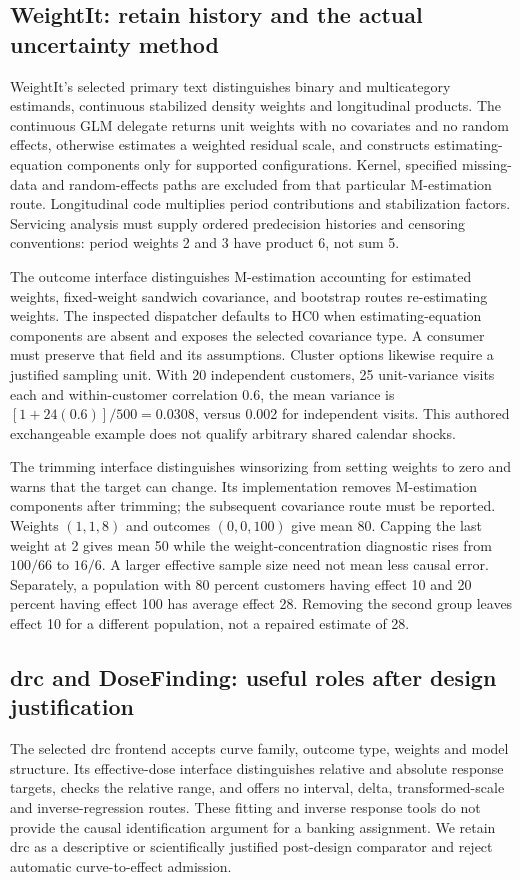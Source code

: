 \subsection{WeightIt: retain history and the actual uncertainty method}
WeightIt's selected primary text distinguishes binary and multicategory
estimands, continuous stabilized density weights and longitudinal products.
The continuous GLM delegate returns unit weights with no covariates and no
random effects, otherwise estimates a weighted residual scale, and constructs
estimating-equation components only for supported configurations. Kernel,
specified missing-data and random-effects paths are excluded from that
particular M-estimation route. Longitudinal code multiplies period
contributions and stabilization factors. Servicing analysis must supply ordered
predecision histories and censoring conventions: period weights 2 and 3 have
product 6, not sum 5.
\citep{exec24_dose_weightit,exec24_dose_contract}

The outcome interface distinguishes M-estimation accounting for estimated
weights, fixed-weight sandwich covariance, and bootstrap routes re-estimating
weights. The inspected dispatcher defaults to HC0 when estimating-equation
components are absent and exposes the selected covariance type. A consumer
must preserve that field and its assumptions. Cluster options likewise require
a justified sampling unit. With 20 independent customers, 25 unit-variance
visits each and within-customer correlation 0.6, the mean variance is
$[1+24(0.6)]/500=0.0308$, versus 0.002 for independent visits. This authored
exchangeable example does not qualify arbitrary shared calendar shocks.
\citep{exec24_dose_weightit,exec24_dose_contract}

The trimming interface distinguishes winsorizing from setting weights to zero
and warns that the target can change. Its implementation removes M-estimation
components after trimming; the subsequent covariance route must be reported.
Weights $(1,1,8)$ and outcomes $(0,0,100)$ give mean 80. Capping the last
weight at 2 gives mean 50 while the weight-concentration diagnostic rises from
$100/66$ to $16/6$. A larger effective sample size need not mean less causal
error. Separately, a population with 80 percent customers having effect 10 and
20 percent having effect 100 has average effect 28. Removing the second group
leaves effect 10 for a different population, not a repaired estimate of 28.
\citep{exec24_dose_weightit,exec24_dose_contract}

\subsection{drc and DoseFinding: useful roles after design justification}
The selected drc frontend accepts curve family, outcome type, weights and model
structure. Its effective-dose interface distinguishes relative and absolute
response targets, checks the relative range, and offers no interval, delta,
transformed-scale and inverse-regression routes. These fitting and inverse
response tools do not provide the causal identification argument for a banking
assignment. We retain drc as a descriptive or scientifically justified
post-design comparator and reject automatic curve-to-effect admission.
\citep{exec24_dose_drc}

